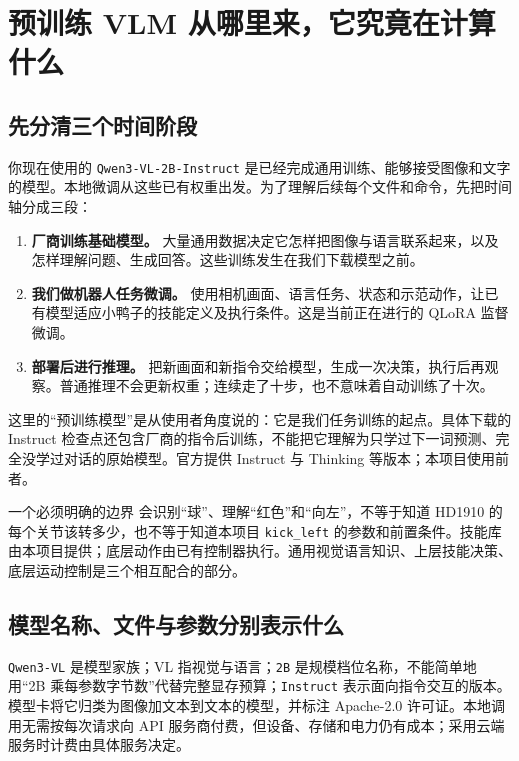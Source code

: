 \chapter{预训练 VLM 从哪里来，它究竟在计算什么}

\section{先分清三个时间阶段}

你现在使用的 \texttt{Qwen3-VL-2B-Instruct} 是已经完成通用训练、能够接受图像和文字的模型。本地微调从这些已有权重出发。为了理解后续每个文件和命令，先把时间轴分成三段：

\begin{enumerate}
\item \textbf{厂商训练基础模型。} 大量通用数据决定它怎样把图像与语言联系起来，以及怎样理解问题、生成回答。这些训练发生在我们下载模型之前。
\item \textbf{我们做机器人任务微调。} 使用相机画面、语言任务、状态和示范动作，让已有模型适应小鸭子的技能定义及执行条件。这是当前正在进行的 QLoRA 监督微调。
\item \textbf{部署后进行推理。} 把新画面和新指令交给模型，生成一次决策，执行后再观察。普通推理不会更新权重；连续走了十步，也不意味着自动训练了十次。
\end{enumerate}

这里的“预训练模型”是从使用者角度说的：它是我们任务训练的起点。具体下载的 Instruct 检查点还包含厂商的指令后训练，不能把它理解为只学过下一词预测、完全没学过对话的原始模型。官方提供 Instruct 与 Thinking 等版本；本项目使用前者。\cite{qwen-card}

\begin{notebox}{一个必须明确的边界}
会识别“球”、理解“红色”和“向左”，不等于知道 HD1910 的每个关节该转多少，也不等于知道本项目 \texttt{kick\_left} 的参数和前置条件。技能库由本项目提供；底层动作由已有控制器执行。通用视觉语言知识、上层技能决策、底层运动控制是三个相互配合的部分。
\end{notebox}

\section{模型名称、文件与参数分别表示什么}

\texttt{Qwen3-VL} 是模型家族；VL 指视觉与语言；\texttt{2B} 是规模档位名称，不能简单地用“2B 乘每参数字节数”代替完整显存预算；\texttt{Instruct} 表示面向指令交互的版本。模型卡将它归类为图像加文本到文本的模型，并标注 Apache-2.0 许可证。本地调用无需按每次请求向 API 服务商付费，但设备、存储和电力仍有成本；采用云端服务时计费由具体服务决定。\cite{qwen-card}

